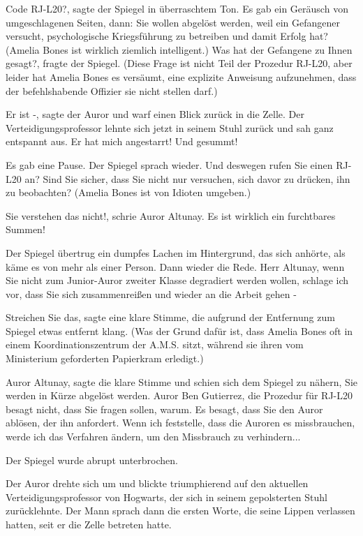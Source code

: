 \glqq Code RJ-L20?\grqq{}, sagte der Spiegel in überraschtem Ton. Es gab ein
Geräusch von umgeschlagenen Seiten, dann: \glqq Sie wollen abgelöst werden, weil
ein Gefangener versucht, psychologische Kriegsführung zu betreiben und damit
Erfolg hat?\grqq{} (Amelia Bones ist wirklich ziemlich intelligent.) \glqq Was
hat der Gefangene zu Ihnen gesagt?\grqq{}, fragte der Spiegel. (Diese Frage ist
nicht Teil der Prozedur RJ-L20, aber leider hat Amelia Bones es versäumt, eine
explizite Anweisung aufzunehmen, dass der befehlshabende Offizier sie nicht
stellen darf.)

\glqq Er ist -\grqq{}, sagte der Auror und warf einen Blick zurück in die Zelle.
Der Verteidigungsprofessor lehnte sich jetzt in seinem Stuhl zurück und sah ganz
entspannt aus. \glqq Er hat mich angestarrt! Und gesummt!\grqq{}

Es gab eine Pause. Der Spiegel sprach wieder. \glqq Und deswegen rufen Sie einen
RJ-L20 an? Sind Sie sicher, dass Sie nicht nur versuchen, sich davor zu drücken,
ihn zu beobachten?\grqq{} (Amelia Bones ist von Idioten umgeben.)

\glqq Sie verstehen das nicht!\grqq{}, schrie Auror Altunay. \glqq Es ist
wirklich ein furchtbares Summen!\grqq{}

Der Spiegel übertrug ein dumpfes Lachen im Hintergrund, das sich anhörte, als
käme es von mehr als einer Person. Dann wieder die Rede. \glqq Herr Altunay,
wenn Sie nicht zum Junior-Auror zweiter Klasse degradiert werden wollen, schlage
ich vor, dass Sie sich zusammenreißen und wieder an die Arbeit gehen -\grqq{}

\glqq Streichen Sie das\grqq{}, sagte eine klare Stimme, die aufgrund der
Entfernung zum Spiegel etwas entfernt klang. (Was der Grund dafür ist, dass
Amelia Bones oft in einem Koordinationszentrum der A.M.S. sitzt, während sie
ihren vom Ministerium geforderten Papierkram erledigt.)

\glqq Auror Altunay\grqq{}, sagte die klare Stimme und schien sich dem Spiegel
zu nähern, \glqq Sie werden in Kürze abgelöst werden. Auror Ben Gutierrez, die
Prozedur für RJ-L20 besagt nicht, dass Sie fragen sollen, warum. Es besagt, dass
Sie den Auror ablösen, der ihn anfordert. Wenn ich feststelle, dass die Auroren
es missbrauchen, werde ich das Verfahren ändern, um den Missbrauch zu
verhindern...\grqq{}

Der Spiegel wurde abrupt unterbrochen.

Der Auror drehte sich um und blickte triumphierend auf den aktuellen
Verteidigungsprofessor von Hogwarts, der sich in seinem gepolsterten Stuhl
zurücklehnte. Der Mann sprach dann die ersten Worte, die seine Lippen verlassen
hatten, seit er die Zelle betreten hatte.


